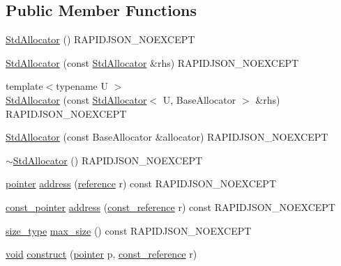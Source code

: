 \subsection*{Public Member Functions}
\begin{DoxyCompactItemize}
\item 
\hyperlink{classStdAllocator_afdef530c5dbd0c4e86922ab263c8ca83}{Std\+Allocator} () R\+A\+P\+I\+D\+J\+S\+O\+N\+\_\+\+N\+O\+E\+X\+C\+E\+PT
\item 
\hyperlink{classStdAllocator_abfb16c76a06015f0ec1abe704375ace8}{Std\+Allocator} (const \hyperlink{classStdAllocator}{Std\+Allocator} \&rhs) R\+A\+P\+I\+D\+J\+S\+O\+N\+\_\+\+N\+O\+E\+X\+C\+E\+PT
\item 
{\footnotesize template$<$typename U $>$ }\\\hyperlink{classStdAllocator_ab41a5cbaf54473e1e10468258629bd1b}{Std\+Allocator} (const \hyperlink{classStdAllocator}{Std\+Allocator}$<$ U, Base\+Allocator $>$ \&rhs) R\+A\+P\+I\+D\+J\+S\+O\+N\+\_\+\+N\+O\+E\+X\+C\+E\+PT
\item 
\hyperlink{classStdAllocator_a40ffe84a544bd5fe938581d09595bd1f}{Std\+Allocator} (const Base\+Allocator \&allocator) R\+A\+P\+I\+D\+J\+S\+O\+N\+\_\+\+N\+O\+E\+X\+C\+E\+PT
\item 
\hyperlink{classStdAllocator_a3d1703f93d5929c71a35e0c9baf9ceb1}{$\sim$\+Std\+Allocator} () R\+A\+P\+I\+D\+J\+S\+O\+N\+\_\+\+N\+O\+E\+X\+C\+E\+PT
\item 
\hyperlink{classStdAllocator_a0c970fb2525af736640f0ac3a29d45c5}{pointer} \hyperlink{classStdAllocator_afbe805c057283166350a93f6c7e7a2c6}{address} (\hyperlink{classStdAllocator_a108581b842584639473a6d3fdd135598}{reference} r) const R\+A\+P\+I\+D\+J\+S\+O\+N\+\_\+\+N\+O\+E\+X\+C\+E\+PT
\item 
\hyperlink{classStdAllocator_add1391b3b872c9be9b4d89ed4fabe296}{const\+\_\+pointer} \hyperlink{classStdAllocator_a56c3bab4003eccf5b7a9d18175ef4dc2}{address} (\hyperlink{classStdAllocator_a2bc4a28386765e3a2c105b270793a49e}{const\+\_\+reference} r) const R\+A\+P\+I\+D\+J\+S\+O\+N\+\_\+\+N\+O\+E\+X\+C\+E\+PT
\item 
\hyperlink{classStdAllocator_af0b177dc293fe5b985ba9e27de23b2c1}{size\+\_\+type} \hyperlink{classStdAllocator_a158b8ba5e88fbcd7a851541090654930}{max\+\_\+size} () const R\+A\+P\+I\+D\+J\+S\+O\+N\+\_\+\+N\+O\+E\+X\+C\+E\+PT
\item 
\hyperlink{imgui__impl__opengl3__loader_8h_ac668e7cffd9e2e9cfee428b9b2f34fa7}{void} \hyperlink{classStdAllocator_a279cb8367857b1263c4ab014b74f842a}{construct} (\hyperlink{classStdAllocator_a0c970fb2525af736640f0ac3a29d45c5}{pointer} p, \hyperlink{classStdAllocator_a2bc4a28386765e3a2c105b270793a49e}{const\+\_\+reference} r)

\end{DoxyCompactItemize}
